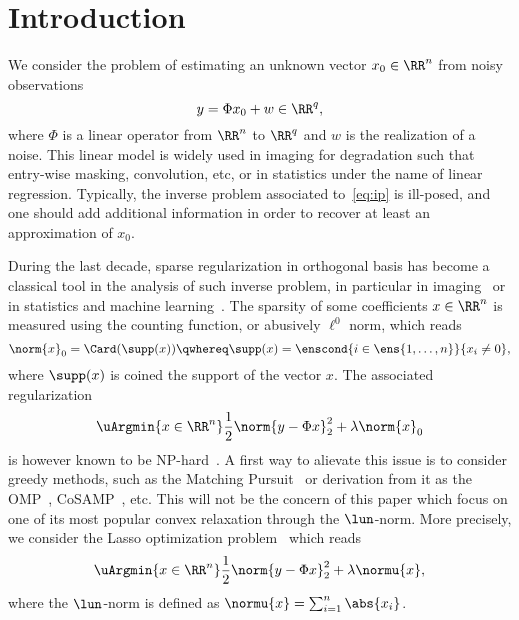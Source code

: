 \section{Introduction}

We consider the problem of estimating an unknown vector $x_0 \in \RR^n$ from noisy observations
\begin{equation}\label{eq:ip}
  y = \Phi x_0 + w \in \RR^q ,
\end{equation}
where $\Phi$ is a linear operator from $\RR^n$ to $\RR^q$ and $w$ is the realization of a noise.
This linear model is widely used in imaging for degradation such that entry-wise masking, convolution, etc, or in statistics under the name of linear regression.
Typically, the inverse problem associated to~\eqref{eq:ip} is ill-posed, and one should add additional information in order to recover at least an approximation of $x_0$.

During the last decade, sparse regularization in orthogonal basis has become a classical tool in the analysis of such inverse problem, in particular in imaging~\cite{chen1999atomi,mallat2009a-wav} or in statistics and machine learning~\cite{tibshirani1996regre}.
The sparsity of some coefficients $x \in \RR^n$ is measured using the counting function, or abusively $\ell^0$ norm, which reads
\begin{equation*}
  \norm{x}_0 = \Card (\supp(x)) \qwhereq \supp(x) = \enscond{i \in \ens{1,\dots,n}}{x_i \neq 0} ,
\end{equation*}
where $\supp(x)$ is coined the support of the vector $x$.
The associated regularization
\begin{equation*}
  \uArgmin{x \in \RR^n} \frac{1}{2} \norm{y - \Phi x}_2^2 + \lambda \norm{x}_0
\end{equation*}
is however known to be NP-hard~\cite{natarajan1995sparse}.
A first way to alievate this issue is to consider greedy methods, such as the Matching Pursuit~\cite{mallat1993matching} or derivation from it as the OMP~\cite{pati1993orthogonal}, CoSAMP~\cite{needel2009cosamp}, etc.
This will not be the concern of this paper which focus on one of its most popular convex relaxation through the $\lun$-norm.
More precisely, we consider the Lasso optimization problem~\cite{tibshirani1996regre} which reads
\begin{equation}
  \label{eq:lasso}
  \uArgmin{x \in \RR^n} \frac{1}{2} \norm{y - \Phi x}_2^2 + \lambda \normu{x} ,
\end{equation}
where the $\lun$-norm is defined as $\normu{x} = \sum_{i=1}^n \abs{x_i}$.

